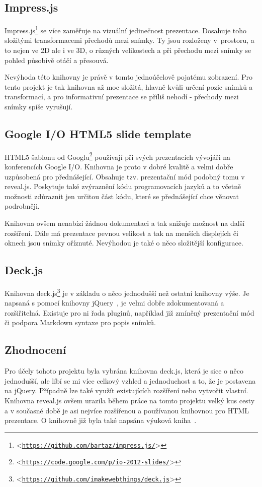 \documentclass[11pt,twoside,a4paper]{book}
\let\oldUrl\url									%
\renewcommand\url[1]{<\texttt{\oldUrl{#1}}>}
\begin{document}
\subsection{Impress.js}
Impress.js\footnote{\url{https://github.com/bartaz/impress.js/}} se více zaměřuje na vizuální jedinečnost prezentace. Dosahuje toho složitými transformacemi přechodů mezi snímky. Ty jsou rozloženy v~prostoru, a to nejen ve 2D ale i ve 3D, o různých velikostech a při přechodu mezi snímky se pohled působivě otáčí a přesouvá.

Nevýhoda této knihovny je právě v tomto jednoúčelově pojatému zobrazení. Pro tento projekt je tak knihovna až moc složitá, hlavně kvůli určení pozic snímků a transformací, a pro informativní prezentace se příliš nehodí - přechody mezi snímky spíše vyrušují.

\subsection{Google I/O HTML5 slide template}
HTML5 šablonu od Googlu\footnote{\url{https://code.google.com/p/io-2012-slides/}} používají při svých prezentacích vývojáři na konferencích Google I/O. Knihovna je proto v dobré kvalitě a velmi dobře uzpůsobená pro přednášející. Obsahuje tzv. prezentační mód podobný tomu v reveal.js. Poskytuje také zvýraznění kódu programovacích jazyků a to včetně možnosti zdůraznit jen určitou část kódu, které se přednášející chce věnovat podrobněji.

Knihovna ovšem nenabízí žádnou dokumentaci a tak snižuje možnost na další rozšíření. Dále má prezentace pevnou velikost a tak na menších displejích či oknech jsou snímky oříznuté. Nevýhodou je také o něco složitější konfigurace.

\subsection{Deck.js}
Knihovna deck.js\footnote{\url{https://github.com/imakewebthings/deck.js}} je v základu o něco jednodušší než ostatní knihovny výše. Je napsaná s pomocí knihovny jQuery~\cite{jQuery}, je velmi dobře zdokumentovaná a rozšiřitelná. Existuje pro ni řada pluginů, například již zmíněný prezentační mód či podpora Markdown syntaxe pro popis snímků. 

\subsection{Zhodnocení}
Pro účely tohoto projektu byla vybrána knihovna deck.js, která je sice o něco jednodušší, ale líbí se mi více celkový vzhled a jednoduchost a to, že je postavena na jQuery. Případně lze také využít existujících rozšíření nebo vytvořit vlastní. Knihovna reveal.js ovšem urazila během práce na tomto projektu velký kus cesty a v současné době je asi nejvíce rozšířenou a používanou knihovnou pro HTML prezentace. O knihovně již byla také napsána výuková kniha~\cite{howtobook}.
\end{document}
